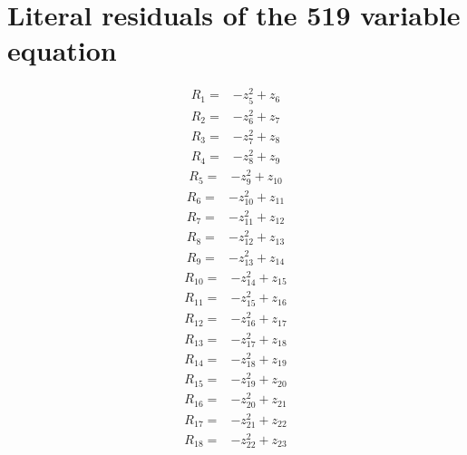 \section{Literal residuals of the 519 variable equation}
\small
\begin{align*}
R_{1}={}&-z_{5}^{2}+z_{6}
\end{align*}
\begin{align*}
R_{2}={}&-z_{6}^{2}+z_{7}
\end{align*}
\begin{align*}
R_{3}={}&-z_{7}^{2}+z_{8}
\end{align*}
\begin{align*}
R_{4}={}&-z_{8}^{2}+z_{9}
\end{align*}
\begin{align*}
R_{5}={}&-z_{9}^{2}+z_{10}
\end{align*}
\begin{align*}
R_{6}={}&-z_{10}^{2}+z_{11}
\end{align*}
\begin{align*}
R_{7}={}&-z_{11}^{2}+z_{12}
\end{align*}
\begin{align*}
R_{8}={}&-z_{12}^{2}+z_{13}
\end{align*}
\begin{align*}
R_{9}={}&-z_{13}^{2}+z_{14}
\end{align*}
\begin{align*}
R_{10}={}&-z_{14}^{2}+z_{15}
\end{align*}
\begin{align*}
R_{11}={}&-z_{15}^{2}+z_{16}
\end{align*}
\begin{align*}
R_{12}={}&-z_{16}^{2}+z_{17}
\end{align*}
\begin{align*}
R_{13}={}&-z_{17}^{2}+z_{18}
\end{align*}
\begin{align*}
R_{14}={}&-z_{18}^{2}+z_{19}
\end{align*}
\begin{align*}
R_{15}={}&-z_{19}^{2}+z_{20}
\end{align*}
\begin{align*}
R_{16}={}&-z_{20}^{2}+z_{21}
\end{align*}
\begin{align*}
R_{17}={}&-z_{21}^{2}+z_{22}
\end{align*}
\begin{align*}
R_{18}={}&-z_{22}^{2}+z_{23}
\end{align*}
